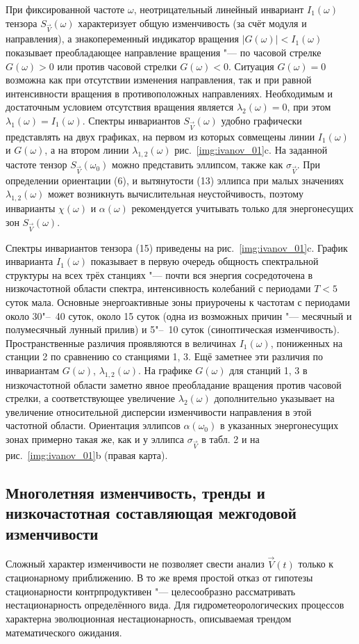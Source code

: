 При фиксированной частоте $\omega$, неотрицательный линейный инвариант ${I_1}(\omega)$ тензора $S_{\vec{V}}(\omega)$ характеризует общую изменчивость (за счёт модуля и направления), а знакопеременный индикатор вращения $|G(\omega)|<{I_1}(\omega)$ показывает преобладающее направление вращения "--- по часовой стрелке $G(\omega)>0$ или против часовой стрелки $G(\omega)<0$. Ситуация $G(\omega)=0$ возможна как при отсутствии изменения направления, так и при равной интенсивности вращения в противоположных направлениях. Необходимым и достаточным условием отсутствия вращения является ${\lambda_{2}}(\omega)=0$, при этом ${\lambda_{1}}(\omega)={I_1}(\omega)$. Спектры инвариантов $S_{\vec{V}}(\omega)$ удобно графически представлять на двух графиках, на первом из которых совмещены линии  ${I_1}(\omega)$ и $G(\omega)$, а на втором линии ${\lambda_{1,2}}(\omega)$ рис.~\ref{img:ivanov_01}c. На заданной частоте тензор $S_{\vec{V}}(\omega_0)$ можно представить эллипсом, также как $\sigma_{\vec{V}}$. При определении ориентации (6), и вытянутости (13) эллипса при малых значениях ${\lambda_{1,2}}(\omega)$ может возникнуть вычислительная неустойчивость, поэтому инварианты $\chi(\omega)$ и $\alpha(\omega)$ рекомендуется учитывать только для энергонесущих зон $S_{\vec{V}}(\omega)$.

Спектры инвариантов тензора (15) приведены на рис.~\ref{img:ivanov_01}c. График инварианта ${I_1}(\omega)$ показывает в первую очередь общность спектральной структуры на всех трёх станциях "--- почти вся энергия сосредоточена в низкочастотной области спектра, интенсивность колебаний с периодами $T<5$ суток мала. Основные энергоактивные зоны приурочены к частотам с периодами около 30"--~40 суток, около 15 суток (одна из возможных причин "--- месячный и полумесячный лунный прилив) и 5"--~10 суток (синоптическая изменчивость). Пространственные различия проявляются в величинах ${I_1}(\omega)$, пониженных на станции 2 по сравнению со станциями 1, 3. Ещё заметнее эти различия по инвариантам $G(\omega)$, ${\lambda_{1,2}}(\omega)$. На графике $G(\omega)$ для станций 1, 3 в низкочастотной области заметно явное преобладание вращения против часовой стрелки, а соответствующее увеличение ${\lambda_{2}}(\omega)$ дополнительно указывает на увеличение относительной дисперсии изменчивости направления в этой частотной области. Ориентация эллипсов $\alpha(\omega_0)$ в указанных энергонесущих зонах примерно такая же, как и у эллипса $\sigma_{\vec{V}}$ в табл. 2 и на рис.~\ref{img:ivanov_01}b (правая карта).  

\subsection{Многолетняя изменчивость, тренды и низкочастотная составляющая межгодовой изменчивости}
Сложный характер изменчивости не позволяет свести анализ ${\vec{V}}(t)$ только к стационарному приближению. В то же время простой отказ от гипотезы стационарности контрпродуктивен "--- целесообразно рассматривать нестационарность определённого вида. Для гидрометеорологических процессов характерна эволюционная нестационарность, описываемая трендом математического ожидания. 

